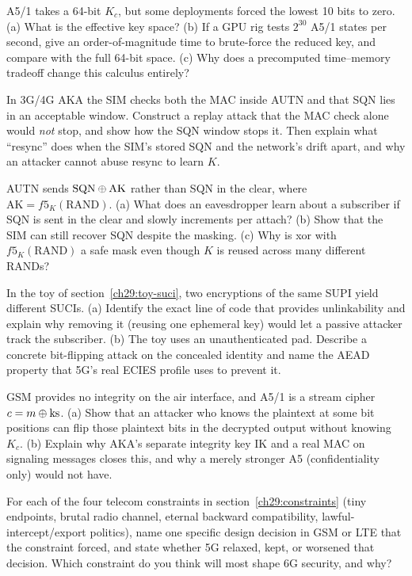 \begin{exercise}
A5/1 takes a 64-bit $K_c$, but some deployments forced the lowest 10 bits to zero. (a) What is the effective key space? (b) If a GPU rig tests $2^{30}$ A5/1 states per second, give an order-of-magnitude time to brute-force the reduced key, and compare with the full 64-bit space. (c) Why does a precomputed time--memory tradeoff change this calculus entirely?
\end{exercise}

\begin{exercise}
In 3G/4G AKA the SIM checks both the MAC inside AUTN and that SQN lies in an acceptable window. Construct a replay attack that the MAC check alone would \emph{not} stop, and show how the SQN window stops it. Then explain what ``resync'' does when the SIM's stored SQN and the network's drift apart, and why an attacker cannot abuse resync to learn $K$.
\end{exercise}

\begin{exercise}
AUTN sends $\text{SQN}\oplus\text{AK}$ rather than SQN in the clear, where $\text{AK}=f5_K(\text{RAND})$. (a) What does an eavesdropper learn about a subscriber if SQN is sent in the clear and slowly increments per attach? (b) Show that the SIM can still recover SQN despite the masking. (c) Why is xor with $f5_K(\text{RAND})$ a safe mask even though $K$ is reused across many different RANDs?
\end{exercise}

\begin{exercise}
In the toy of section~\ref{ch29:toy-suci}, two encryptions of the same SUPI yield different SUCIs. (a) Identify the exact line of code that provides unlinkability and explain why removing it (reusing one ephemeral key) would let a passive attacker track the subscriber. (b) The toy uses an unauthenticated pad. Describe a concrete bit-flipping attack on the concealed identity and name the AEAD property that 5G's real ECIES profile uses to prevent it.
\end{exercise}

\begin{exercise}
GSM provides no integrity on the air interface, and A5/1 is a stream cipher $c = m \oplus \text{ks}$. (a) Show that an attacker who knows the plaintext at some bit positions can flip those plaintext bits in the decrypted output without knowing $K_c$. (b) Explain why AKA's separate integrity key IK and a real MAC on signaling messages closes this, and why a merely stronger A5 (confidentiality only) would not have.
\end{exercise}

\begin{exercise}
For each of the four telecom constraints in section~\ref{ch29:constraints} (tiny endpoints, brutal radio channel, eternal backward compatibility, lawful-intercept/export politics), name one specific design decision in GSM or LTE that the constraint forced, and state whether 5G relaxed, kept, or worsened that decision. Which constraint do you think will most shape 6G security, and why?
\end{exercise}
